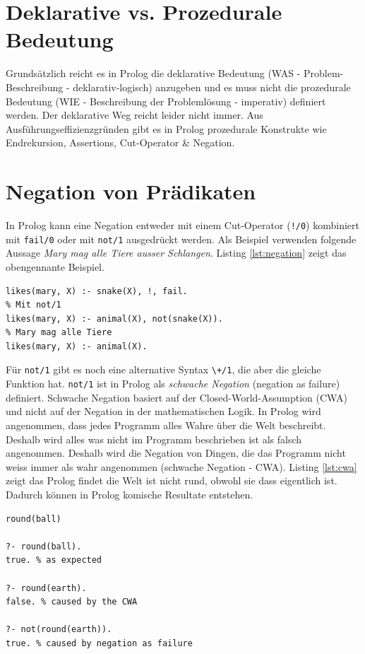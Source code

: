 \section{Deklarative vs. Prozedurale Bedeutung}
Grundsätzlich reicht es in Prolog die deklarative Bedeutung (WAS - Problem-Beschreibung - deklarativ-logisch) anzugeben und es muss nicht die prozedurale Bedeutung (WIE - Beschreibung der Problemlösung - imperativ) definiert werden. Der deklarative Weg reicht leider nicht immer. Aus Ausführungseffizienzgründen gibt es in Prolog prozedurale Konstrukte wie Endrekursion, Assertions, Cut-Operator \& Negation.


\section{Negation von Prädikaten}

In Prolog kann eine Negation entweder mit einem Cut-Operator (\verb|!/0|) kombiniert mit \verb|fail/0| oder mit \verb|not/1| ausgedrückt werden. Als Beispiel verwenden folgende Aussage \textit{Mary mag alle Tiere ausser Schlangen}. Listing \ref{lst:negation} zeigt das obengennante Beispiel.

\begin{lstlisting}[caption=Negation, label=lst:negation]
% Wenn X eine Schlange unterbreche Backtracking und Regel ist falsch
likes(mary, X) :- snake(X), !, fail.
% Mit not/1
likes(mary, X) :- animal(X), not(snake(X)).
% Mary mag alle Tiere
likes(mary, X) :- animal(X).
\end{lstlisting}

Für \verb|not/1| gibt es noch eine alternative Syntax \verb|\+/1|, die aber die gleiche Funktion hat. \verb|not/1| ist in Prolog als \textit{schwache Negation} (negation as failure) definiert. Schwache Negation basiert auf der Closed-World-Assumption (CWA) und nicht auf der Negation in der mathematischen Logik. In Prolog wird angenommen, dass jedes Programm alles Wahre über die Welt beschreibt. Deshalb wird alles was nicht im Programm beschrieben ist als falsch angenommen. Deshalb wird die Negation von Dingen, die das Programm nicht weiss immer als wahr angenommen (schwache Negation - CWA). Listing \ref{lst:cwa} zeigt das Prolog findet die Welt ist nicht rund, obwohl sie dass eigentlich ist. Dadurch können in Prolog komische Resultate entstehen.

\begin{lstlisting}[caption=CWA, label=lst:cwa]
round(ball)

?- round(ball).
true. % as expected

?- round(earth).
false. % caused by the CWA

?- not(round(earth)).
true. % caused by negation as failure
\end{lstlisting}

